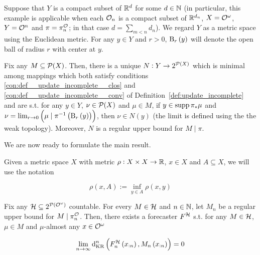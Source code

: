 \begin{samepage}
\begin{example}
\label{exm:update_incomplete_euclid}

Suppose that $Y$ is a compact subset of $\mathbb{R}^{d}$ for some $d \in \mathbb{N}$ (in particular, this example is applicable when each $\mathcal{O}_n$ is a compact subset of $\mathbb{R}^{d_n}$, $X=\mathcal{O}^\omega$, $Y=\mathcal{O}^n$ and $\pi=\pi^{\mathcal{O}}_n$; in that case $d=\sum_{m < n} d_n$). We regard $Y$ as a metric space using the Euclidean metric. For any $y \in Y$ and $r > 0$, $\operatorname{B}_r\left(y\right)$ will denote the open ball of radius $r$ with center at $y$. 

Fix any $M \subseteq \mathcal{P}(X)$. Then, there is a unique $N: Y \rightarrow 2^{\mathcal{P}(X)}$ which is minimal among mappings which both satisfy conditions \ref{con:def__update_incomplete__clos} and \ref{con:def__update_incomplete__conv} of Definition~\ref{def:update_incomplete} and are s.t. for any $y \in Y$, $\nu \in \mathcal{P}(X)$ and $\mu \in M$, if $y \in \operatorname{supp} \pi_*\mu$ and $\nu = \lim_{r \rightarrow 0}{\left(\mu \mid \pi^{-1}\left(\operatorname{B}_r\left(y\right)\right)\right)}$, then $\nu \in N(y)$ (the limit is defined using the the weak topology). Moreover, $N$ is a regular upper bound for $M \mid \pi$.

\end{example}
\end{samepage}

We are now ready to formulate the main result.

Given a metric space $X$ with metric $\rho: X \times X \rightarrow \mathbb{R}$, $x \in X$ and $A \subseteq X$, we will use the notation

\begin{equation}
\rho\left(x,A\right):=\inf_{y \in A} \rho\left(x,y\right)
\end{equation}

\begin{theorem}
\label{thm:main}

Fix any $\mathcal{H} \subseteq 2^{\mathcal{P}(\mathcal{O}^\omega)}$ countable. For every $M \in \mathcal{H}$ and $n \in \mathbb{N}$, let $M_n$ be a regular upper bound for $M \mid \pi^{\mathcal{O}}_n$. Then, there exists a forecaster $F^{\mathcal{H}}$ s.t. for any $M \in \mathcal{H}$, $\mu \in M$ and $\mu$-almost any $x \in \mathcal{O}^\omega$

\begin{equation}
\label{eqn:thm_main}
\lim_{n \rightarrow \infty} \operatorname{d}_{\textnormal{KR}}^n\left(F^{\mathcal{H}}_n\left(x_{:n}\right),M_n\left(x_{:n}\right)\right) = 0
\end{equation}

\end{theorem}

